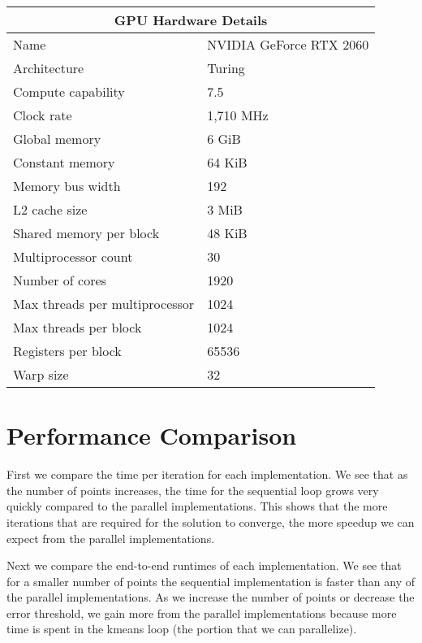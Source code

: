 \documentclass{article}
\begin{document}
\begin{center}
\begin{tabular}{|l|l|}
  \hline
  \multicolumn{2}{|c|}{\bf GPU Hardware Details} \\ \hline
  Name & NVIDIA GeForce RTX 2060        \\ \hline
  Architecture & Turing                 \\ \hline
  Compute capability & 7.5              \\ \hline
  Clock rate & 1,710 MHz                \\ \hline
  Global memory & 6 GiB                 \\ \hline
  Constant memory & 64 KiB              \\ \hline
  Memory bus width & 192                \\ \hline
  L2 cache size & 3 MiB                 \\ \hline
  Shared memory per block & 48 KiB      \\ \hline
  Multiprocessor count & 30             \\ \hline
  Number of cores & 1920                \\ \hline
  Max threads per multiprocessor & 1024 \\ \hline
  Max threads per block & 1024          \\ \hline
  Registers per block & 65536           \\ \hline
  Warp size & 32                        \\ \hline
\end{tabular}
\end{center}

\section{Performance Comparison}

First we compare the time per iteration for each implementation.
We see that as the number of points increases, the time for the sequential loop
grows very quickly compared to the parallel implementations.
This shows that the more iterations that are required for the solution to
converge, the more speedup we can expect from the parallel implementations.

\begin{center}
  
\end{center}

Next we compare the end-to-end runtimes of each implementation.
We see that for a smaller number of points the sequential implementation is
faster than any of the parallel implementations.
As we increase the number of points or decrease the error threshold, we
gain more from the parallel implementations because more time is spent in the
kmeans loop (the portion that we can parallelize).
\end{document}
